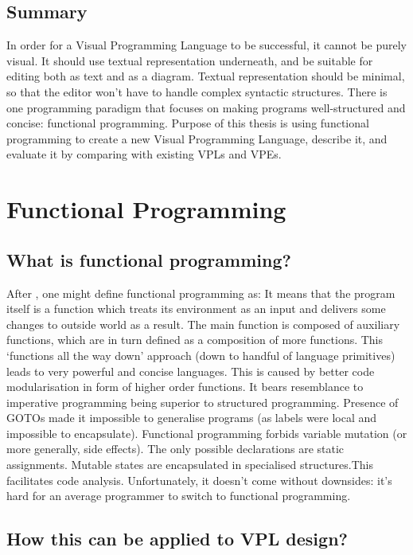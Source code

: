 \documentclass[11pt]{scrartcl}
\begin{document}
\subsection{Summary}
In order for a Visual Programming Language to be successful, it cannot be purely visual. It should use textual representation underneath, and be suitable for editing both as text and as a diagram. Textual representation should be minimal, so that the editor won’t have  to handle complex syntactic structures. There is one programming paradigm that focuses on making programs well-structured and concise: functional programming.
Purpose of this thesis is using functional programming to create a new Visual Programming Language, describe it, and evaluate it by comparing with existing VPLs and VPEs.

\section{Functional Programming}
\subsection{What is functional programming?}
After \cite{WhyFPMatters}, one might define functional programming as:
It means that the program itself is a function which treats its environment as an input and delivers some changes to outside world as a result. The main function is composed of auxiliary functions, which are in turn defined as a composition of more functions. This ‘functions all the way down’ approach (down to handful of language primitives) leads to very powerful and concise languages. This is caused by better code modularisation in form of higher order functions. It bears resemblance to imperative programming being superior to structured programming. Presence of GOTOs made it impossible to generalise programs (as labels were local and impossible to encapsulate). Functional programming forbids variable mutation (or more generally, side effects). The only possible declarations are static assignments. Mutable states are encapsulated in specialised structures.This facilitates code analysis. Unfortunately, it doesn’t come without downsides: it’s hard for an average programmer to switch to functional programming.

\subsection{How this can be applied to VPL design?}
\end{document}
